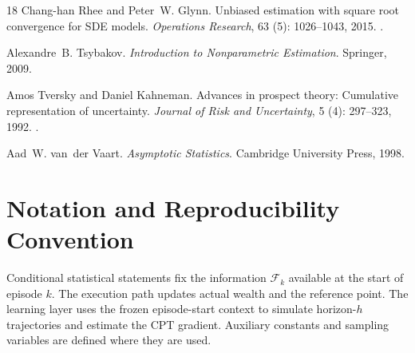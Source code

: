 \documentclass[11pt]{article}
\newcommand{\1}{\mathbf 1}
\newcommand{\cF}{\mathcal F}
\newcommand{\CPT}{\ensuremath{\mathrm{CPT}}\xspace}
\begin{document}
\begin{thebibliography}{18}
Chang-han Rhee and Peter~W. Glynn.
\newblock Unbiased estimation with square root convergence for {SDE} models.
\newblock \emph{Operations Research}, 63 (5): 1026--1043,
  2015.
\newblock {}.

Alexandre~B. Tsybakov.
\newblock \emph{Introduction to Nonparametric Estimation}.
\newblock Springer, 2009.

Amos Tversky and Daniel Kahneman.
\newblock Advances in prospect theory: Cumulative representation of
  uncertainty.
\newblock \emph{Journal of Risk and Uncertainty}, 5 (4):
  297--323, 1992.
\newblock {}.

Aad~W. van~der Vaart.
\newblock \emph{Asymptotic Statistics}.
\newblock Cambridge University Press, 1998.

\end{thebibliography}

\clearpage
\appendix

\section{Notation and Reproducibility Convention}\label{app:notation}

Conditional statistical statements fix the information $\cF_k$ available at the start of episode $k$. The execution path updates actual wealth and the reference point. The learning layer uses the frozen episode-start context to simulate horizon-$h$ trajectories and estimate the \CPT gradient. Auxiliary constants and sampling variables are defined where they are used.
\end{document}
